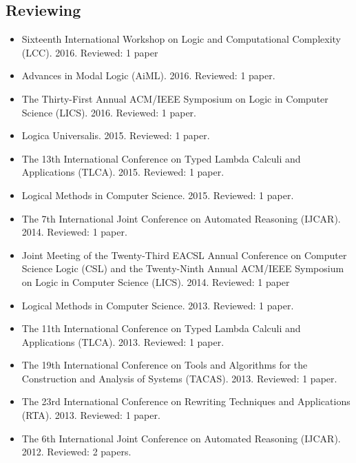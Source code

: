 \documentclass{article}
\begin{document}
  \subsection{Reviewing}
  \label{subsec:reviewing}  
  \begin{itemize}
  \item[] Sixteenth International Workshop on Logic and Computational Complexity (LCC). 2016. Reviewed: 1 paper
  \item[] Advances in Modal Logic (AiML). 2016. Reviewed: 1 paper.
    
  \item[] The Thirty-First Annual ACM/IEEE Symposium on Logic in Computer Science (LICS). 2016. Reviewed: 1 paper.

  \item[] Logica Universalis. 2015. Reviewed: 1 paper.
    
  \item[] The 13th International Conference on Typed Lambda Calculi and Applications (TLCA). 2015. Reviewed: 1 paper.
    
  \item[] Logical Methods in Computer Science. 2015. Reviewed: 1 paper.
    
  \item[] The 7th International Joint Conference on Automated Reasoning (IJCAR). 2014. Reviewed: 1 paper.

  \item[] Joint Meeting of the Twenty-Third EACSL Annual Conference on Computer Science Logic (CSL) and the Twenty-Ninth Annual ACM/IEEE Symposium on Logic in Computer Science (LICS). 2014. Reviewed: 1 paper

  \item[] Logical Methods in Computer Science. 2013. Reviewed: 1 paper.
    
  \item[] The 11th International Conference on Typed Lambda Calculi and Applications (TLCA). 2013. Reviewed: 1 paper.

  \item[] The 19th International Conference on Tools and Algorithms for the Construction and Analysis of Systems (TACAS).
    2013. Reviewed: 1 paper.
  
  \item[] The 23rd International Conference on Rewriting Techniques and Applications (RTA). 2013. Reviewed: 1 paper.

  \item[] The 6th International Joint Conference on Automated Reasoning (IJCAR). 2012. Reviewed: 2 papers.
  \end{itemize}
  
\end{document}
